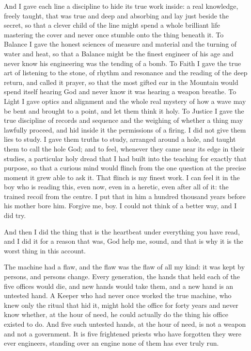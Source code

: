 And I gave each line a discipline to hide its true work inside: a real knowledge, freely taught, that was true and deep and absorbing and lay just beside the secret, so that a clever child of the line might spend a whole brilliant life mastering the cover and never once stumble onto the thing beneath it. To Balance I gave the honest sciences of measure and material and the turning of water and heat, so that a Balance might be the finest engineer of his age and never know his engineering was the tending of a bomb. To Faith I gave the true art of listening to the stone, of rhythm and resonance and the reading of the deep return, and called it prayer, so that the most gifted ear in the Mountain would spend itself hearing God and never know it was hearing a weapon breathe. To Light I gave optics and alignment and the whole real mystery of how a wave may be bent and brought to a point, and let them think it holy. To Justice I gave the true discipline of records and sequence and the weighing of whether a thing may lawfully proceed, and hid inside it the permissions of a firing. I did not give them lies to study. I gave them truths to study, arranged around a hole, and taught them to call the hole God; and to feel, whenever they came near its edge in their studies, a particular holy dread that I had built into the teaching for exactly that purpose, so that a curious mind would flinch from the one question at the precise moment it grew able to ask it. That flinch is my finest work. I can feel it in the boy who is reading this, even now, even in a heretic, even after all of it: the trained recoil from the centre. I put that in him a hundred thousand years before his mother bore him. Forgive me, boy. I could not think of a better way, and I did try.\par

\ornament

And then I did the thing that is the heartbeat under everything you have read, and I did it for a reason that was, God help me, sound, and that is why it is the worst thing in this account.\par

The machine had a flaw, and the flaw was the flaw of all my kind: it was kept by persons, and persons change. Every generation, the hands that held each of the five offices would die, and new hands would take them, and a new hand is an untested hand. A Keeper who had never once worked the true machine, who knew only the ritual that hid it, might hold the office for forty years and never know whether, at the hour of need, he could actually do the thing his office existed to do. And five such untested hands, at the hour of need, is not a weapon and not a government. It is five frightened priests who have forgotten they were ever engineers, standing over an engine none of them has ever truly run.\par

